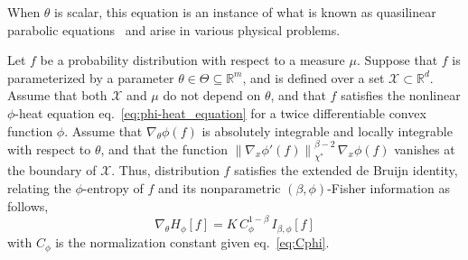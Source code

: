 \documentclass[entropy,article,submit,moreauthors,pdftex]{Definitions/mdpi}
\newcommand{\SZ}[1]{{\color{blue} #1}}                                       %
\def\Rset{\mathbb{R}}%
\def\X{\mathcal{X}}%
\begin{document}
\SZ{When $\theta$ is  scalar, this equation is  an instance of what  is known as
  quasilinear  parabolic  equations~\cite[\S~8.8]{Rou05}  and arise  in  various
  physical problems.}


\begin{Proposition}
\label{prop:phiDeBruijn}
%
  Let  $f$  be  a  probability   distribution  \SZ{with  respect  to  a  measure
    $\mu$. Suppose that $f$ is} parameterized  by a parameter $\theta \in \Theta
  \subseteq   \Rset^m$,   \SZ{and  is}   defined   over   a  set   $\X   \subset
  \Rset^d$. \SZ{Assume that both $\X$ and  $\mu$} do not depend on $\theta$, and
  \SZ{that    $f$     satisfies}    the    nonlinear     $\phi$-heat    equation
  eq.~\eqref{eq:phi-heat_equation}  for a  twice differentiable  convex function
  $\phi$.   Assume that  $\nabla_\theta  \phi(f)$ is  absolutely integrable  and
  locally integrable  with respect to  $\theta$, and that the  function $\left\|
  \nabla_x \phi'(f) \right\|_{\chi^*}^{\beta-2} \, \nabla_x \phi(f)$ vanishes at
  the boundary of $\X$.  Thus, distribution $f$ satisfies the extended de Bruijn
  identity,   relating  the   $\phi$-entropy  of   $f$  and   its  nonparametric
  $(\beta,\phi)$-Fisher information as follows,
  \begin{equation}
  \label{eq:phiDeBruijn}
  \nabla_\theta H_\phi[f] = K \, C_\phi^{1-\beta} \, I_{\beta,\phi}[f]
  \end{equation}
  with $C_\phi$ is the normalization constant given eq.~\eqref{eq:Cphi}.
\end{Proposition}
\end{document}
